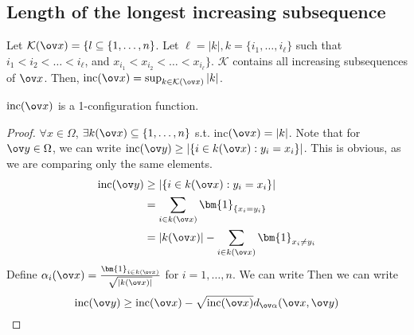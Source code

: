 \subsection{Length of the longest increasing subsequence} 
Let $\mathcal{K}(\ov x) = \{l \subseteq \{1, \dots, n\}$. Let $\ell = |k|, k = \{i_1, \dots, i_\ell\}$ such that $i_1 < i_2 < \dots <i_\ell$, and $x_{i_1} < x_{i_2} < \dots < x_{i_\ell}\}$. $\mathcal{K}$ contains all increasing subsequences of $\ov x$. Then, $\text{inc}(\ov x) = \sup_{k \in \mathcal{K} (\ov x)} |k|$. 
\begin{prop}
    $\text{inc}(\ov x)$ is a 1-configuration function.
\end{prop}
\begin{proof}
$\forall x \in \Omega$, $\exists k(\ov x) \subseteq \{1, \dots, n\}$ s.t. inc$(\ov x)= |k|$.
Note that for $\ov y \in \Omega$, we can write $\text{inc}(\ov y) \geq |\{i \in k(\ov x) : y_i = x_i\}|$. This is obvious, as we are comparing only the same elements.
\begin{align*}
    \text{inc}(\ov y) &\geq |\{i \in k(\ov x) : y_i = x_i\}| \\
    &= \sum_{i \in k(\ov x)} \bm{1}_{\{x_i = y_i\}} \\
    &= |k(\ov x)| - \sum_{i \in k(\ov x)} \bm{1}_{x_i \neq y_i}
\end{align*}
Define $\alpha_i(\ov x) = \frac{\bm{1}_{i \in k(\ov x)}}{\sqrt{|k(\ov x)|}}$ for $i = 1, \dots, n$. We can write
Then we can write
\[
\text{inc} (\ov y) \geq \text{inc}(\ov x) - \sqrt{\text{inc}(\ov x)} d_{\ov \alpha}(\ov x, \ov y)
\]
\end{proof}
